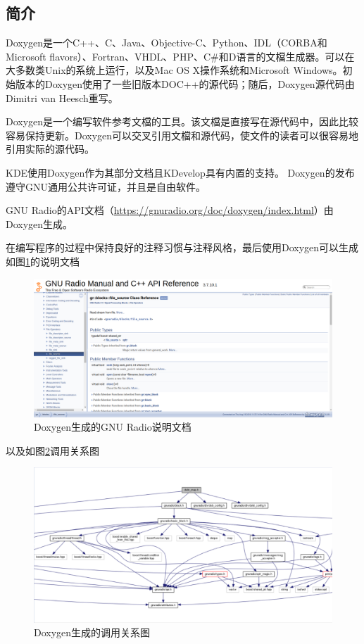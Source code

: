 		\subsection{简介}
			\par Doxygen是一个C++、C、Java、Objective-C、Python、IDL（CORBA和Microsoft flavors）、Fortran、VHDL、PHP、C\#和D语言的文檔生成器。可以在大多数类Unix的系统上运行，以及Mac OS X操作系统和Microsoft Windows。初始版本的Doxygen使用了一些旧版本DOC++的源代码；随后，Doxygen源代码由Dimitri van Heesch重写。
			\par Doxygen是一个编写软件参考文檔的工具。该文檔是直接写在源代码中，因此比较容易保持更新。Doxygen可以交叉引用文檔和源代码，使文件的读者可以很容易地引用实际的源代码。
			\par KDE使用Doxygen作为其部分文档且KDevelop具有内置的支持。 Doxygen的发布遵守GNU通用公共许可证，并且是自由软件。\cite{ wiki:Doxygen}
			\par GNU Radio的API文档（\href{https://gnuradio.org/doc/doxygen/index.html}{https://gnuradio.org/doc/doxygen/index.html}）由Doxygen生成。
			\par 在编写程序的过程中保持良好的注释习惯与注释风格，最后使用Doxygen可以生成如图\ref{fig:doxygen_gnuradio}的说明文档
			\begin{figure}[htb]
				\centering
				\includegraphics[width=13cm]{figures/doxygen_gnuradio.png}
				\caption{Doxygen生成的GNU Radio说明文档}
				\label{fig:doxygen_gnuradio}
			\end{figure}
			\par 以及如图\ref{fig:doxygen_dvbt_map}调用关系图
			\begin{figure}[htb]
				\centering
				\includegraphics[width=13cm]{figures/doxygen_dvbt_map.png}
				\caption{Doxygen生成的调用关系图}
				\label{fig:doxygen_dvbt_map}
			\end{figure}
